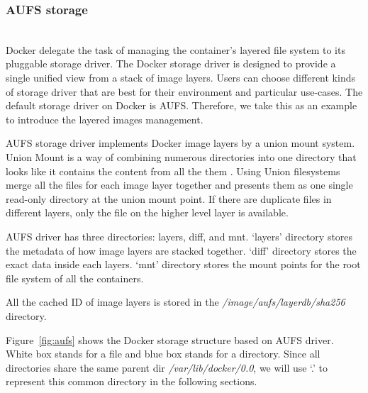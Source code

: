 

\subsubsection{AUFS storage}~\\
Docker delegate the task of managing the container's layered file system to its pluggable storage driver. 
The Docker storage driver is designed to provide a single unified view from a stack of image layers.
Users can choose different kinds of storage driver that are best for their environment and particular use-cases. The default storage driver on Docker is AUFS. Therefore, we take this as an example to introduce the layered images management.

AUFS storage driver implements Docker image layers by a union mount system. Union Mount is a way of combining numerous directories into one directory that looks like it contains the content from all the them \cite{aufs}. Using Union filesystems merge all the files for each image layer together and presents them as one single read-only directory at the union mount point. If there are duplicate files in different layers, only the file on the higher level layer is available.

AUFS driver has three directories: layers, diff, and mnt. `layers' directory stores the metadata of how image layers are stacked together. `diff' directory stores the exact data inside each layers. `mnt' directory stores the mount points for the root file system of all the containers. 

All the cached ID of image layers is stored in the \textit{/image/aufs/layerdb/sha256} directory.



Figure~\ref{fig:aufs} shows the Docker storage structure based on AUFS driver. White box stands for a file and blue box stands for a directory. Since all directories share the same parent dir \textit{/var/lib/docker/0.0}, we will use `.' to represent this common directory in the following sections. 

